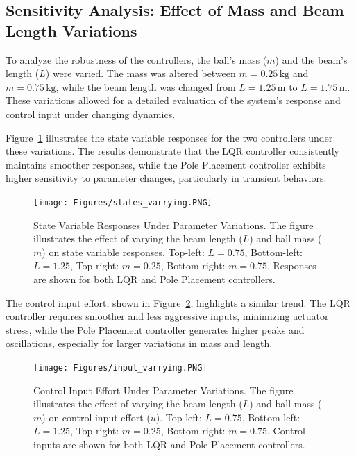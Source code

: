 \documentclass[conference]{IEEEtran}
\begin{document}
\subsection{Sensitivity Analysis: Effect of Mass and Beam Length Variations}
\label{subsec:sensitivity_analysis}

To analyze the robustness of the controllers, the ball's mass (\(m\)) and the beam's length (\(L\)) were varied. The mass was altered between \(m = 0.25\, \mathrm{kg}\) and \(m = 0.75\, \mathrm{kg}\), while the beam length was changed from \(L = 1.25\, \mathrm{m}\) to \(L = 1.75\, \mathrm{m}\). These variations allowed for a detailed evaluation of the system's response and control input under changing dynamics.

Figure~\ref{fig:states_varrying} illustrates the state variable responses for the two controllers under these variations. The results demonstrate that the LQR controller consistently maintains smoother responses, while the Pole Placement controller exhibits higher sensitivity to parameter changes, particularly in transient behaviors.

\begin{figure}[H]
    \centering
    \texttt{[image: Figures/states\_varrying.PNG]}
    \caption{State Variable Responses Under Parameter Variations. 
    The figure illustrates the effect of varying the beam length (\(L\)) and ball mass (\(m\)) on state variable responses. 
    Top-left: \(L = 0.75\), Bottom-left: \(L = 1.25\), Top-right: \(m = 0.25\), Bottom-right: \(m = 0.75\). Responses are shown for both LQR and Pole Placement controllers.}
    \label{fig:states_varrying}
\end{figure}

The control input effort, shown in Figure~\ref{fig:input_varrying}, highlights a similar trend. The LQR controller requires smoother and less aggressive inputs, minimizing actuator stress, while the Pole Placement controller generates higher peaks and oscillations, especially for larger variations in mass and length.

\begin{figure}[H]
    \centering
    \texttt{[image: Figures/input\_varrying.PNG]}
    \caption{Control Input Effort Under Parameter Variations. 
    The figure illustrates the effect of varying the beam length (\(L\)) and ball mass (\(m\)) on control input effort (\(u\)). 
    Top-left: \(L = 0.75\), Bottom-left: \(L = 1.25\), Top-right: \(m = 0.25\), Bottom-right: \(m = 0.75\). Control inputs are shown for both LQR and Pole Placement controllers.}
    \label{fig:input_varrying}
\end{figure}
\end{document}
